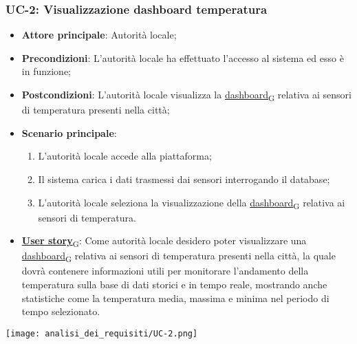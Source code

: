 \subsubsection{UC-2: Visualizzazione dashboard temperatura}
\begin{itemize}
	\item \textbf{Attore principale}: Autorità locale;
	\item \textbf{Precondizioni}: L'autorità locale ha effettuato l'accesso al sistema ed esso è in funzione;
	\item \textbf{Postcondizioni}: L'autorità locale visualizza la \href{https://7last.github.io/docs/rtb/documentazione-interna/glossario\#dashboard}{dashboard\textsubscript{G}} relativa
	      ai sensori di temperatura presenti nella città;
	\item \textbf{Scenario principale}:
	      \begin{enumerate}
		      \item L'autorità locale accede alla piattaforma;
		      \item Il sistema carica i dati trasmessi dai sensori interrogando il database;
		      \item L'autorità locale seleziona la visualizzazione della \href{https://7last.github.io/docs/rtb/documentazione-interna/glossario\#dashboard}{dashboard\textsubscript{G}} relativa ai sensori di temperatura.
	      \end{enumerate}
	\item \href{https://7last.github.io/docs/rtb/documentazione-interna/glossario\#user-story}{\textbf{User story}\textsubscript{G}}:
	      Come autorità locale desidero poter visualizzare una \href{https://7last.github.io/docs/rtb/documentazione-interna/glossario\#dashboard}{dashboard\textsubscript{G}} relativa ai sensori di temperatura presenti nella città, la quale
	      dovrà contenere informazioni utili per monitorare l'andamento della temperatura sulla base di dati storici e in tempo reale, mostrando
	      anche statistiche come la temperatura media, massima e minima nel periodo di tempo selezionato.
\end{itemize}
\begin{center}
	\texttt{[image: analisi\_dei\_requisiti/UC-2.png]}
\end{center}

